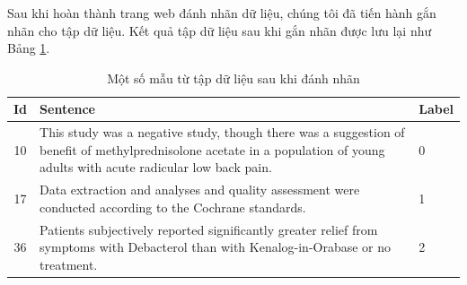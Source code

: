 Sau khi hoàn thành trang web đánh nhãn dữ liệu, chúng tôi đã tiến hành gắn nhãn cho tập dữ liệu. Kết quả tập dữ liệu sau khi gắn nhãn được lưu lại như Bảng \ref{table:labeleddata}.




\begin{table}[H]
\centering
\begin{minipage}{1.0\textwidth}
\caption{Một số mẫu từ tập dữ liệu sau khi đánh nhãn} \label{table:labeleddata}
\label{table:labeleddata}
\begin{tabular}{ |c|p{}|l| } 
 \hline
 \textbf{Id} & \textbf{Sentence} & \textbf{Label} \\ 
 \hline
 10 & This study was a negative study, though there was a suggestion of benefit of methylprednisolone acetate in a population of young adults with acute radicular low back pain. & 0\\ \hline
 17 & Data extraction and analyses and quality assessment were conducted according to the Cochrane standards. & 1\\ \hline
 36 & Patients subjectively reported significantly greater relief from symptoms with Debacterol than with Kenalog-in-Orabase or no treatment. & 2\\ 
 \hline
\end{tabular}
\end{minipage}
\end{table}

